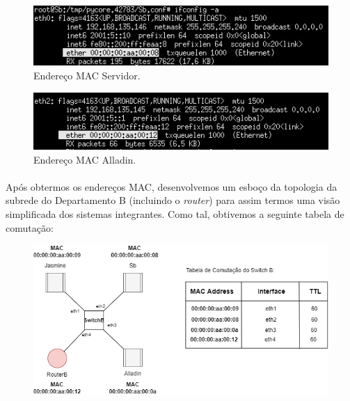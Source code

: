     \begin{minipage}{0.5\linewidth}
        \centering
            \begin{figure}[H]
            \includegraphics[width=\linewidth]{prints/Questao5/Servidor.jpg}
            \caption{Endereço MAC Servidor.} \label{questao5-MAC-Servidor}
            \end{figure}
    \end{minipage}
    \begin{minipage}{0.5\linewidth}
        \centering
            \begin{figure}[H]
            \includegraphics[width=\linewidth]{prints/Questao5/Router.jpg}
            \caption{Endereço MAC Alladin.} \label{questao5-MAC-Router}
            \end{figure}
    \end{minipage}
    
    \paragraph{}
    \par Após obtermos os endereços MAC, desenvolvemos um esboço da topologia da subrede do Departamento B (incluindo o \textit{router}) para assim termos uma visão simplificada dos sistemas integrantes. Como tal, obtivemos a seguinte tabela de comutação:
    
    \begin{figure}[H]
    \centering
    \includegraphics[width=450pt]{prints/Questao5/switch.png}
    \label{questao5-switchTable}
    \end{figure}